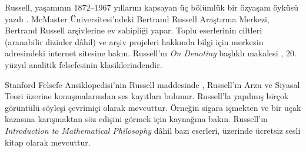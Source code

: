 \begin{reading}
Russell, yaşamının 1872--1967 yıllarını kapsayan üç bölümlük bir özyaşam
öyküsü yazdı \citep{Russell1967,Russell1968,Russell1969}. McMaster
Üniversitesi'ndeki Bertrand Russell Araştırma Merkezi, Bertrand Russell
arşivlerine ev sahipliği yapar. Toplu eserlerinin ciltleri (aranabilir
dizinler dâhil) ve arşiv projeleri hakkında bilgi için merkezin
\citet{Duncan2015} adresindeki internet sitesine bakın. Russell'ın
\emph{On Denoting} başlıklı makalesi \citep{Russell1905}, 20. yüzyıl analitik
felsefesinin klasiklerindendir.

Stanford Felsefe Ansiklopedisi'nin Russell maddesinde \citep{Irvine2015},
Russell'ın Arzu ve Siyasal Teori üzerine konuşmalarından ses kayıtları
bulunur. Russell'la yapılmış birçok görüntülü söyleşi çevrimiçi olarak
mevcuttur. Örneğin sigara içmekten ve bir uçak kazasına karışmaktan söz
edişini görmek için \citet{RussellND} kaynağına bakın. Russell'ın
\emph{Introduction to Mathematical Philosophy} dâhil bazı eserleri,
\citet{LibriVoxND} üzerinde ücretsiz sesli kitap olarak mevcuttur.
\end{reading}

